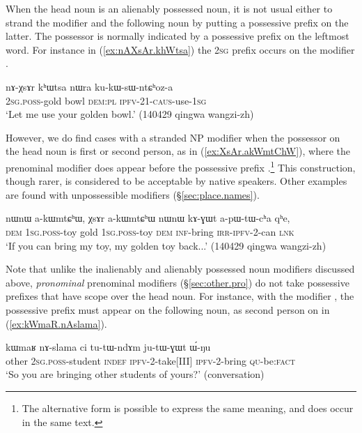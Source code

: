When the head noun is an alienably possessed noun, it is not usual either to strand the modifier and the following noun by putting a possessive prefix on the latter. The possessor is normally indicated by a possessive prefix on the leftmost word. For instance in (\ref{ex:nAXsAr.khWtsa}) the \textsc{2sg} prefix  occurs on the modifier .

\begin{exe}
\ex \label{ex:nAXsAr.khWtsa}
\gll nɤ-χsɤr kʰɯtsa nɯra ku-kɯ-sɯ-ntɕʰoz-a \\
\textsc{2sg}.\textsc{poss}-gold bowl \textsc{dem}:\textsc{pl} \textsc{ipfv}-2\fl{}1-\textsc{caus}-use-\textsc{1sg} \\
\glt `Let me use your golden bowl.' (140429 qingwa wangzi-zh) 
\end{exe}

However, we do find cases with a stranded NP modifier when the possessor on the head noun is first or second person, as in (\ref{ex:XsAr.akWmtChW}), where the prenominal modifier  does appear before the possessive prefix .\footnote{The alternative form  is possible to express the same meaning, and does occur in the same text. } This construction, though rarer, is considered to be acceptable by native speakers. Other examples are found with unpossessible modifiers (§\ref{sec:place.names}).

\begin{exe}
\ex \label{ex:XsAr.akWmtChW}
\gll nɯnɯ a-kɯmtɕʰɯ, χsɤr a-kɯmtɕʰɯ nɯnɯ kɤ-ɣɯt a-pɯ-tɯ-cʰa qʰe, \\
\textsc{dem} \textsc{1sg}.\textsc{poss}-toy gold \textsc{1sg}.\textsc{poss}-toy \textsc{dem} \textsc{inf}-bring \textsc{irr}-\textsc{ipfv}-2-can \textsc{lnk} \\
\glt `If you can bring my toy, my golden toy back...' (140429 qingwa wangzi-zh)
\end{exe}

Note that unlike the inalienably and alienably possessed noun modifiers discussed above, \textit{pronominal} prenominal modifiers (§\ref{sec:other.pro}) do not take possessive prefixes that have scope over the head noun. For instance, with the modifier , the possessive prefix must appear on the following noun, as second person  on  in (\ref{ex:kWmaR.nAslama}).

\begin{exe}
\ex \label{ex:kWmaR.nAslama}
 \gll kɯmaʁ nɤ-slama ci tu-tɯ-ndɤm ju-tɯ-ɣɯt ɯ́-ŋu \\
 other \textsc{2sg}.\textsc{poss}-student \textsc{indef} \textsc{ipfv}-2-take[III] \textsc{ipfv}-2-bring \textsc{qu}-be:\textsc{fact} \\
 \glt `So you are bringing other students of yours?' (conversation)
\end{exe}

